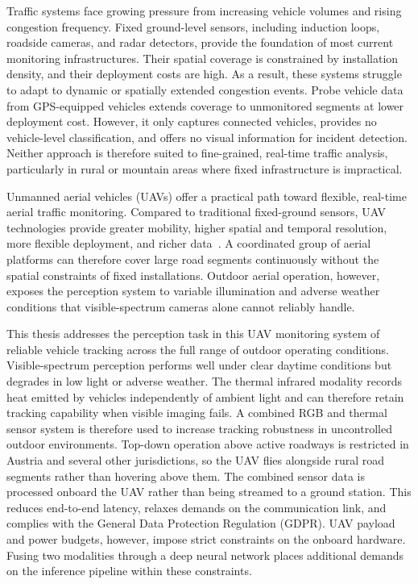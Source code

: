\documentclass[12pt,oneside,bibtotoc,liststotoc]{scrbook}
\begin{document}
Traffic systems face growing pressure from increasing vehicle volumes
and rising congestion frequency. Fixed ground-level sensors, including induction loops, roadside cameras, and
radar detectors, provide the foundation of most current monitoring
infrastructures. Their spatial coverage is constrained by installation density,
and their deployment costs are high. As a result, these systems struggle to
adapt to dynamic or spatially extended congestion events. Probe vehicle data
from GPS-equipped vehicles extends coverage to unmonitored segments at lower
deployment cost. However, it only captures connected vehicles, provides no
vehicle-level classification, and offers no visual information for incident
detection. Neither approach is therefore suited to fine-grained,
real-time traffic analysis, particularly in rural or mountain areas where
fixed infrastructure is impractical.

Unmanned aerial vehicles (UAVs) offer a practical path toward
flexible, real-time aerial traffic monitoring. Compared to traditional
fixed-ground sensors, UAV technologies provide greater mobility, higher
spatial and temporal resolution, more flexible deployment, and richer
data~\cite{liu2025skysEyePerspectiveUAVHighwayReview}. A coordinated group of aerial
platforms can therefore cover large road segments continuously without the spatial
constraints of fixed installations. Outdoor aerial operation, however, exposes
the perception system to variable illumination and adverse weather conditions
that visible-spectrum cameras alone cannot reliably handle.

This thesis addresses the perception task in this UAV monitoring system of reliable vehicle
tracking across the full range of outdoor operating conditions.
Visible-spectrum perception performs well under clear daytime conditions but
degrades in low light or adverse weather. The thermal infrared modality records heat
emitted by vehicles independently of ambient light and can therefore retain
tracking capability when visible imaging fails. A combined RGB and thermal
sensor system is therefore used to increase tracking robustness in uncontrolled
outdoor environments. Top-down operation above active roadways is restricted
in Austria and several other jurisdictions, so the UAV flies alongside rural
road segments rather than hovering above them. The combined sensor data is
processed onboard the UAV rather than being streamed to a ground station.
This reduces end-to-end latency, relaxes demands on the communication link,
and complies with the General Data Protection Regulation (GDPR). UAV payload
and power budgets, however, impose strict constraints on the onboard hardware.
Fusing two modalities through a deep neural network places additional demands
on the inference pipeline within these constraints.
\end{document}
